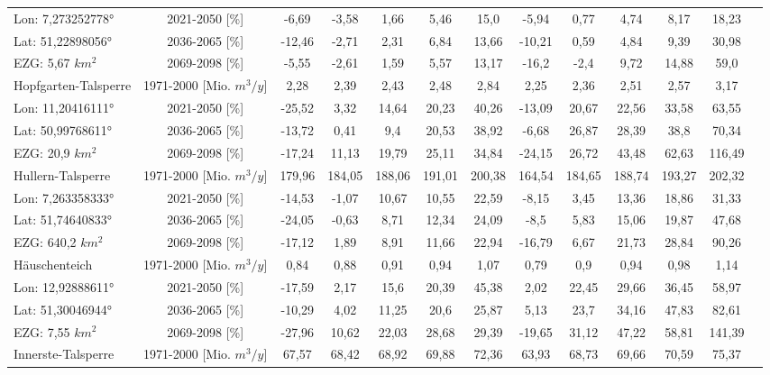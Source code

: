 \begin{longtable}{@{\extracolsep{\fill}}lc|ccccc||cccccc}
\cline{2-13} 
Lon: 7,273252778° & 2021-2050 [\%]  & -6,69 & -3,58 & 1,66 & 5,46 & 15,0 & -5,94 & 0,77 & 4,74 & 8,17 & 18,23 & \\ 
Lat: 51,22898056° & 2036-2065 [\%]  & -12,46 & -2,71 & 2,31 & 6,84 & 13,66 & -10,21 & 0,59 & 4,84 & 9,39 & 30,98 & \\ 
EZG: 5,67 $km^2$ & 2069-2098 [\%]  & -5,55 & -2,61 & 1,59 & 5,57 & 13,17 & -16,2 & -2,4 & 9,72 & 14,88 & 59,0 & \\ 
\hline 
Hopfgarten-Talsperre & 1971-2000 [Mio. $m^3/y$]  & 2,28 & 2,39 & 2,43 & 2,48 & 2,84 & 2,25 & 2,36 & 2,51 & 2,57 & 3,17 & \\ 
\cline{2-13} 
Lon: 11,20416111° & 2021-2050 [\%]  & -25,52 & 3,32 & 14,64 & 20,23 & 40,26 & -13,09 & 20,67 & 22,56 & 33,58 & 63,55 & \\ 
Lat: 50,99768611° & 2036-2065 [\%]  & -13,72 & 0,41 & 9,4 & 20,53 & 38,92 & -6,68 & 26,87 & 28,39 & 38,8 & 70,34 & \\ 
EZG: 20,9 $km^2$ & 2069-2098 [\%]  & -17,24 & 11,13 & 19,79 & 25,11 & 34,84 & -24,15 & 26,72 & 43,48 & 62,63 & 116,49 & \\ 
\hline 
Hullern-Talsperre & 1971-2000 [Mio. $m^3/y$]  & 179,96 & 184,05 & 188,06 & 191,01 & 200,38 & 164,54 & 184,65 & 188,74 & 193,27 & 202,32 & \\ 
\cline{2-13} 
Lon: 7,263358333° & 2021-2050 [\%]  & -14,53 & -1,07 & 10,67 & 10,55 & 22,59 & -8,15 & 3,45 & 13,36 & 18,86 & 31,33 & \\ 
Lat: 51,74640833° & 2036-2065 [\%]  & -24,05 & -0,63 & 8,71 & 12,34 & 24,09 & -8,5 & 5,83 & 15,06 & 19,87 & 47,68 & \\ 
EZG: 640,2 $km^2$ & 2069-2098 [\%]  & -17,12 & 1,89 & 8,91 & 11,66 & 22,94 & -16,79 & 6,67 & 21,73 & 28,84 & 90,26 & \\ 
\hline 
Häuschenteich & 1971-2000 [Mio. $m^3/y$]  & 0,84 & 0,88 & 0,91 & 0,94 & 1,07 & 0,79 & 0,9 & 0,94 & 0,98 & 1,14 & \\ 
\cline{2-13} 
Lon: 12,92888611° & 2021-2050 [\%]  & -17,59 & 2,17 & 15,6 & 20,39 & 45,38 & 2,02 & 22,45 & 29,66 & 36,45 & 58,97 & \\ 
Lat: 51,30046944° & 2036-2065 [\%]  & -10,29 & 4,02 & 11,25 & 20,6 & 25,87 & 5,13 & 23,7 & 34,16 & 47,83 & 82,61 & \\ 
EZG: 7,55 $km^2$ & 2069-2098 [\%]  & -27,96 & 10,62 & 22,03 & 28,68 & 29,39 & -19,65 & 31,12 & 47,22 & 58,81 & 141,39 & \\ 
\hline 
Innerste-Talsperre & 1971-2000 [Mio. $m^3/y$]  & 67,57 & 68,42 & 68,92 & 69,88 & 72,36 & 63,93 & 68,73 & 69,66 & 70,59 & 75,37 & \\ 

\end{longtable}
